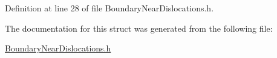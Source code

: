 Definition at line 28 of file Boundary\+Near\+Dislocations.\+h.



The documentation for this struct was generated from the following file\+:\begin{DoxyCompactItemize}
\item 
\hyperlink{_boundary_near_dislocations_8h}{Boundary\+Near\+Dislocations.\+h}\end{DoxyCompactItemize}
